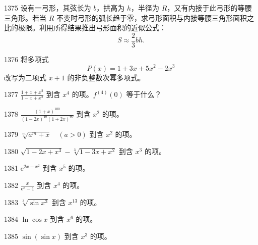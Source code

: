 \begin{prob}[M]{1375}
设有一弓形，其弦长为 $b$，拱高为 $h$，半径为 $R$，又有内接于此弓形的等腰三角形。若当 $R$ 不变时弓形的弧长趋于零，求弓形面积与内接等腰三角形面积之比的极限。利用所得结果推出弓形面积的近似公式：
\[
S \approx \frac{2}{3} bh.
\]
\end{prob}


\begin{prob}[M]{1376}
将多项式
\[
P(x) = 1 + 3x + 5x^2 - 2x^3
\]
改写为二项式 $x + 1$ 的非负整数次幂多项式。
\end{prob}


\begin{prob}[S]{1377}
$\frac{1 + x + x^2}{1 - x + x^2}$ 到含 $x^4$ 的项。$f^{(4)}(0)$ 等于什么？
\end{prob}

\begin{prob}[S]{1378}
$\frac{(1 + x)^{100}}{(1 - 2x)^{40}(1 + 2x)^{60}}$ 到含 $x^2$ 的项。
\end{prob}

\begin{prob}[S]{1379}
$\sqrt[m]{a^m + x} \quad (a > 0)$ 到含 $x^2$ 的项。
\end{prob}

\begin{prob}[S]{1380}
$\sqrt{1 - 2x + x^3} - \sqrt[3]{1 - 3x + x^2}$ 到含 $x^3$ 的项。
\end{prob}

\begin{prob}[S]{1381}
$\mathrm{e}^{2x - x^2}$ 到含 $x^5$ 的项。
\end{prob}

\begin{prob}[S]{1382}
$\frac{x}{\mathrm{e}^x - 1}$ 到含 $x^4$ 的项。
\end{prob}

\begin{prob}[S]{1383}
$\sqrt[3]{\sin x^3}$ 到含 $x^{13}$ 的项。
\end{prob}

\begin{prob}[S]{1384}
$\ln\cos x$ 到含 $x^6$ 的项。
\end{prob}

\begin{prob}[S]{1385}
$\sin(\sin x)$ 到含 $x^3$ 的项。
\end{prob}


